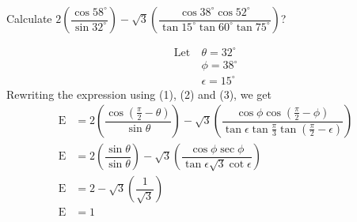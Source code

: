 
%
%
%
%
% 

\question[4] Calculate $2\left(\dfrac{\cos 58^\circ}{\sin 32^\circ}\right) - \sqrt{3} \left(\dfrac{\cos 38^\circ \cos 52^\circ}{\tan 15^\circ \tan 60^\circ \tan 75^\circ}\right)$?
\ifprintanswers
\fi 
\begin{solution}
  \begin{align}
    \text{Let}\: &\theta   = 32^\circ \\ 
         	     &\phi     = 38^\circ \\ 
                 &\epsilon = 15^\circ 
  \end{align}
  Rewriting the expression using (1), (2) and (3), we get \linebreak
  \begin{align}
    \text{E} &= 2\left(\dfrac{\cos(\frac{\pi}{2}-\theta)}{\sin \theta}\right) - 
  	       		 \sqrt{3}
  	       		 \left(\dfrac{\cos \phi \cos(\frac{\pi}{2}-\phi)}
  	       			   {\tan \epsilon \tan \frac{\pi}{3} \tan(\frac{\pi}{2}-\epsilon)}
		   		\right) \\
    \text{E} &= 2\left(\dfrac{\sin \theta}{\sin \theta}\right) - 
  	       		 \sqrt{3}
  	       		 \left(\dfrac{\cos \phi \sec \phi}
  	       			   {\tan \epsilon \sqrt{3} \cot \epsilon}
		   		\right) \\
    \text{E} &= 2 - \sqrt{3}\left(\dfrac{1}{\sqrt{3}}\right) \nonumber \\
    \text{E} &= 1
  \end{align}    
\end{solution}
